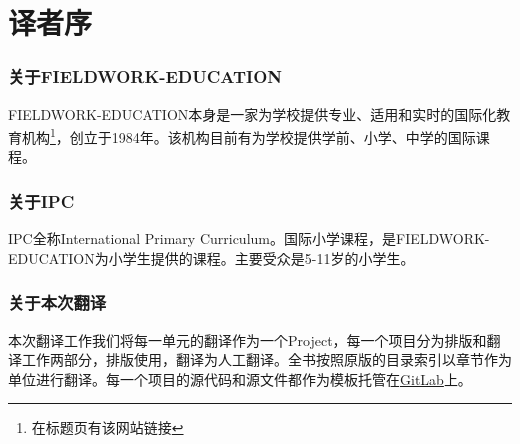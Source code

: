 \chapter{译者序}


\subsection{关于FIELDWORK-EDUCATION}
     \lettrine[lines=1]{F}{IELDWORK-EDUCATION}本身是一家为学校提供专业、适用和实时的国际化教育机构\footnote{在标题页有该网站链接}，创立于1984年。该机构目前有为学校提供学前、小学、中学的国际课程。\par

\subsection{关于IPC}
     \lettrine[lines=2]{I}{PC}全称International Primary Curriculum。国际小学课程，是FIELDWORK-EDUCATION为小学生提供的课程。主要受众是5-11岁的小学生。\par

\subsection{关于本次翻译}
     \lettrine[lines=2]{本}{次翻译工作}我们将每一单元的翻译作为一个Project，每一个项目分为排版和翻译工作两部分，排版使用\LaTeXe，翻译为人工翻译。全书按照原版的目录索引以章节作为单位进行翻译。每一个项目的源代码和源文件都作为模板托管在\href{https://gitlab.com/haotianmichael/LatexTemplate}{GitLab}上。\par
     
     


    
